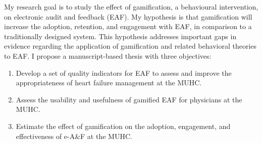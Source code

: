 My research goal is to study the effect of gamification, a behavioural intervention, on electronic audit and feedback (\gls{EAF}).  My hypothesis is that gamification will increase the adoption, retention, and engagement with \gls{EAF}, in comparison to a traditionally designed system. This hypothesis addresses important gaps in evidence regarding the application of gamification and related behavioral theories to \gls{EAF}. I propose a manuscript-based thesis with three objectives:

\begin{enumerate}
    \item Develop a set of quality indicators for \gls{EAF} to assess and improve the appropriateness of heart failure management at the MUHC.
    \item Assess the usability and usefulness of gamified \gls{EAF} for physicians at the MUHC.
    \item Estimate the effect of gamification on the adoption, engagement, and effectiveness of e-A\&F at the MUHC.
\end{enumerate}


